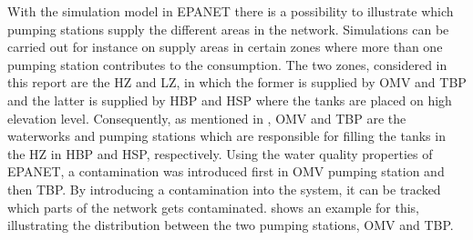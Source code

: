 With the simulation model in EPANET there is a possibility to illustrate which pumping stations supply the different areas in the network. Simulations can be carried out for instance on supply areas in certain zones where more than one pumping station contributes to the consumption. The two zones, considered in this report are the HZ and LZ, in which the former is supplied by OMV and TBP and the latter is supplied by HBP and HSP where the tanks are placed on high elevation level. Consequently, as mentioned in , OMV and TBP are the waterworks and pumping stations which are responsible for filling the tanks in the HZ in HBP and HSP, respectively. 
Using the water quality properties of EPANET, a contamination was introduced first in OMV pumping station and then TBP. By introducing a contamination into the system, it can be tracked which parts of the network gets contaminated.  shows an example for this, illustrating the distribution between the two pumping stations, OMV and TBP. 



